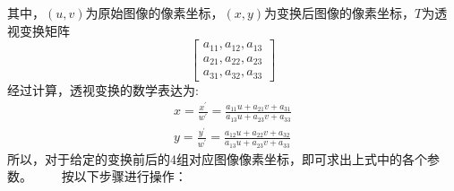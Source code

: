 \documentclass[12pt]{cumcmart}   %
\begin{document}
其中，$(u,v)$为原始图像的像素坐标，$(x,y)$为变换后图像的像素坐标，$T$为透视变换矩阵
\begin{equation}
\left[ \begin{array}{l}
{a_{11}},{a_{12}},{a_{13}}\\
{a_{21}},{a_{22}},{a_{23}}\\
{a_{31}},{a_{32}},{a_{33}}
\end{array} \right]
\end{equation}
经过计算，透视变换的数学表达为:
\begin{equation}
\begin{array}{l}
x = \frac{{{x^{'}}}}{{{w^{'}}}} = \frac{{{a_{11}}u + {a_{21}}v + {a_{31}}}}{{{a_{13}}u + {a_{23}}v + {a_{33}}}}\\
y = \frac{{{y^{'}}}}{{{w^{'}}}} = \frac{{{a_{12}}u + {a_{22}}v + {a_{32}}}}{{{a_{13}}u + {a_{23}}v + {a_{33}}}}  \label{bianhuan}
\end{array}
\end{equation}
所以，对于给定的变换前后的4组对应图像像素坐标，即可求出上式中的各个参数。
$\qquad$按以下步骤进行操作：
\end{document}
